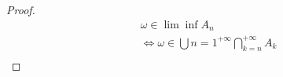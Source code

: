 \documentclass[12pt, a4paper, oneside]{ctexart}
\begin{document}
\begin{proof}
  $$ \begin{aligned}                                                                                                                                                                                                                                                                                                                                                                                                                                                                                                                                                                                                                                                                                                                                                                                                                                                                                                                                                                                                                                                                                                                                                                                                                                                                                                                                                                                                                                                                                                                                                         & \omega \in \lim \inf A_n                                                      \\
                                                                                                                                                                                                                                                                                                                                                                                                                                                                                                                                                                                                                                                                                                                                                                                                                                                                                                                                                                                                                                                                                                                                                                                                                                                                                                                                                                                                                                                                                                                                                                        & \Leftrightarrow  \omega \in \bigcup{n=1}^{+\infty}\bigcap_{k=n}^{+\infty}A_k  \\

\end{aligned}$$
\end{proof}
\end{document}
